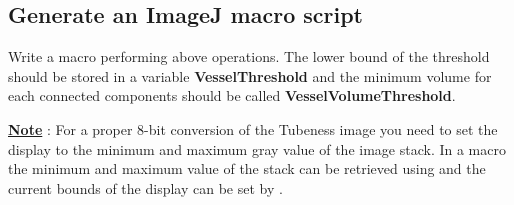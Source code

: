 \subsection{Generate an ImageJ macro script}
Write a macro performing above operations. The lower bound of the threshold should be stored in a variable \textbf{VesselThreshold} and the minimum volume for each connected components should be called \textbf{VesselVolumeThreshold}.

\textbf{\underline{Note}} : For a proper 8-bit conversion of the Tubeness image you need to set the display to the minimum and maximum gray value of the image stack. In a macro the minimum and maximum value of the stack can be retrieved using  and the current bounds of the display can be set by .



